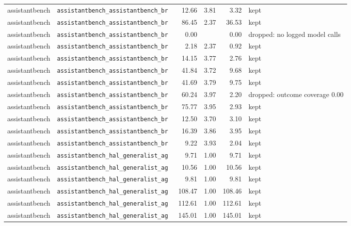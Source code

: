 {\begin{longtable}{llrrrl}
assistantbench & \texttt{\scriptsize assistantbench\_assistantbench\_br~} & 12.66 & 3.81 & 3.32 & kept \\
assistantbench & \texttt{\scriptsize assistantbench\_assistantbench\_br~} & 86.45 & 2.37 & 36.53 & kept \\
assistantbench & \texttt{\scriptsize assistantbench\_assistantbench\_br~} & 0.00 &  & 0.00 & dropped: no logged model calls~ \\
assistantbench & \texttt{\scriptsize assistantbench\_assistantbench\_br~} & 2.18 & 2.37 & 0.92 & kept \\
assistantbench & \texttt{\scriptsize assistantbench\_assistantbench\_br~} & 14.15 & 3.77 & 2.76 & kept \\
assistantbench & \texttt{\scriptsize assistantbench\_assistantbench\_br~} & 41.84 & 3.72 & 9.68 & kept \\
assistantbench & \texttt{\scriptsize assistantbench\_assistantbench\_br~} & 41.69 & 3.79 & 9.75 & kept \\
assistantbench & \texttt{\scriptsize assistantbench\_assistantbench\_br~} & 60.24 & 3.97 & 2.20 & dropped: outcome coverage 0.00 \\
assistantbench & \texttt{\scriptsize assistantbench\_assistantbench\_br~} & 75.77 & 3.95 & 2.93 & kept \\
assistantbench & \texttt{\scriptsize assistantbench\_assistantbench\_br~} & 12.50 & 3.70 & 3.10 & kept \\
assistantbench & \texttt{\scriptsize assistantbench\_assistantbench\_br~} & 16.39 & 3.86 & 3.95 & kept \\
assistantbench & \texttt{\scriptsize assistantbench\_assistantbench\_br~} & 9.22 & 3.93 & 2.04 & kept \\
assistantbench & \texttt{\scriptsize assistantbench\_hal\_generalist\_ag~} & 9.71 & 1.00 & 9.71 & kept \\
assistantbench & \texttt{\scriptsize assistantbench\_hal\_generalist\_ag~} & 10.56 & 1.00 & 10.56 & kept \\
assistantbench & \texttt{\scriptsize assistantbench\_hal\_generalist\_ag~} & 9.81 & 1.00 & 9.81 & kept \\
assistantbench & \texttt{\scriptsize assistantbench\_hal\_generalist\_ag~} & 108.47 & 1.00 & 108.46 & kept \\
assistantbench & \texttt{\scriptsize assistantbench\_hal\_generalist\_ag~} & 112.61 & 1.00 & 112.61 & kept \\
assistantbench & \texttt{\scriptsize assistantbench\_hal\_generalist\_ag~} & 145.01 & 1.00 & 145.01 & kept \\

\end{longtable}}
